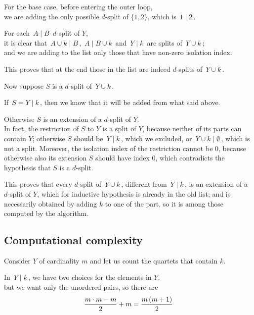 \documentclass[./main.tex]{subfiles}
\begin{document}
For the base case, before entering the outer loop, \\
\bsp we are adding the only possible $d$-split of $\{1,2\}$, which is $\, 1 \mathbin{|} 2 \,$.\bigskip

For each $\, A \mathbin{|} B \,$ $d$-split of $Y$, \\
\bsp it is clear that $\, A \cup k \mathbin{|} B \,$, $\, A \mathbin{|} B \cup k \,$ and $\, Y \mathbin{|} k \,$ are splits of $\, Y \cup k \ $; \\
and we are adding to the list only those that have non-zero isolation index.

This proves that at the end those in the list are indeed $d$-splits of $\, Y \cup k \,$.\bigskip

Now suppose $S$ is a $d$-split of $\, Y \cup k \,$.

If $\, S = Y \mathbin{|} k \,$, then we know that it will be added from what said above.

Otherwise $S$ is an extension of a $d$-split of $Y$. \\
In fact, the restriction of $S$ to $Y$ is a split of $Y$, because neither of its parts can contain $Y$; otherwise $S$ should be $\, Y \mathbin{|} k \,$, which we excluded, or $\, Y \cup k \mathbin{|} \emptyset \,$, which is not a split. Moreover, the isolation index of the restriction cannot be $0$, because otherwise also its extension $S$ should have index $0$, which contradicts the hypothesis that $S$ is a $d$-split.

This proves that every $d$-split of $\, Y \cup k \,$, different from $\, Y \mathbin{|} k \,$, is an extension of a $d$-split of $Y$, which for inductive hypothesis is already in the old list; and is necessarily obtained by adding $k$ to one of the part, so it is among those computed by the algorithm.

\clearpage


\subsection*{Computational complexity}

Consider $Y$ of cardinality $m$ and let us count the quartets that contain $k$.\bigskip

In $\, Y \mathbin{|} k \,$, we have two choices for the elements in $Y$, \\
\bsp but we want only the unordered pairs, so there are
\[ \frac{m \cdot m - m}{2} + m = \frac{m\,(m + 1)}{2} \eqspace{0pt}{\medskipamount} \]
\end{document}
